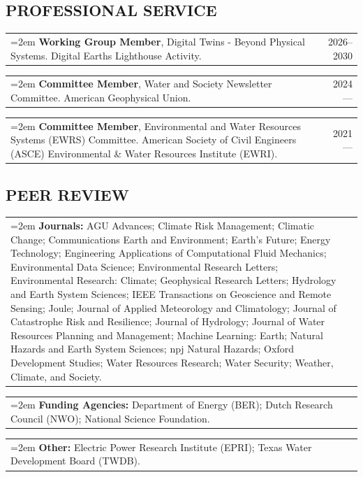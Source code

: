 \documentclass[10pt,oneside]{article}
\makeatletter
\newenvironment{alignedentrieshang}[1][2em]{%
  \noindent%
}{%
}
\newcommand{\hangingitem}[2]{%
  \noindent%
  \begin{tabular*}{\textwidth}{@{}p{0.85\textwidth}@{\extracolsep{\fill}}r@{}}%
    \hangindent=2em \hangafter=1 #1 & #2%
  \end{tabular*}%
}
\makeatother
\begin{document}
\subsection{PROFESSIONAL SERVICE}
\begin{alignedentrieshang}

\hangingitem{\textbf{Working Group Member}, Digital Twins - Beyond Physical Systems. Digital Earths Lighthouse Activity.}{2026--2030}

\hangingitem{\textbf{Committee Member}, Water and Society Newsletter Committee. American Geophysical Union.}{2024---}

\hangingitem{\textbf{Committee Member}, Environmental and Water Resources Systems (EWRS) Committee. American Society of Civil Engineers (ASCE) Environmental \& Water Resources Institute (EWRI).}{2021---}

\end{alignedentrieshang}

\subsection{PEER REVIEW}
\begin{alignedentrieshang}[2em]
  \hangingitem{\textbf{Journals:} AGU Advances; Climate Risk Management; Climatic Change; Communications Earth and Environment; Earth's Future; Energy Technology; Engineering Applications of Computational Fluid Mechanics; Environmental Data Science; Environmental Research Letters; Environmental Research: Climate; Geophysical Research Letters; Hydrology and Earth System Sciences; IEEE Transactions on Geoscience and Remote Sensing; Joule; Journal of Applied Meteorology and Climatology; Journal of Catastrophe Risk and Resilience; Journal of Hydrology; Journal of Water Resources Planning and Management; Machine Learning: Earth; Natural Hazards and Earth System Sciences; npj Natural Hazards; Oxford Development Studies; Water Resources Research; Water Security; Weather, Climate, and Society.
  }{}
  \hangingitem{\textbf{Funding Agencies:} Department of Energy (BER); Dutch Research Council (NWO); National Science Foundation.
  }{}
  \hangingitem{\textbf{Other:} Electric Power Research Institute (EPRI); Texas Water Development Board (TWDB).
  }{}
\end{alignedentrieshang}
%
\end{document}
